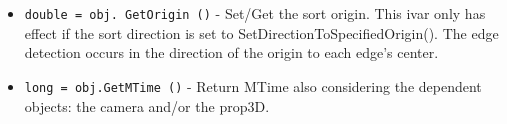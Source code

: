 \begin{itemize}
\item  \verb|double = obj. GetOrigin ()| -  Set/Get the sort origin. This ivar only has effect if the sort direction
 is set to SetDirectionToSpecifiedOrigin(). The edge detection occurs in
 the direction of the origin to each edge's center.

\item  \verb|long = obj.GetMTime ()| -  Return MTime also considering the dependent objects: the camera
 and/or the prop3D.

\end{itemize}
